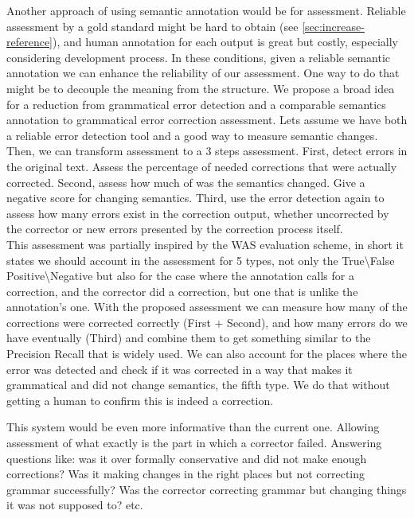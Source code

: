 \documentclass[english]{article}
\begin{document}
{Another approach of using semantic annotation would be for assessment.
Reliable assessment by a gold standard might be hard to obtain (see
\ref{sec:increase-reference}), and human annotation for each output is great\cite{madnani2011they}
but costly, especially considering development process. In these conditions,
given a reliable semantic annotation we can enhance the reliability
of our assessment. One way to do that might be to decouple the meaning
from the structure. We propose a broad idea for a reduction from grammatical
error detection and a comparable semantics annotation to grammatical
error correction assessment. Lets assume we have both a reliable error
detection tool and a good way to measure semantic changes. Then, we
can transform assessment to a 3 steps assessment. First, detect errors
in the original text. Assess the percentage of needed corrections
that were actually corrected. Second, assess how much of was the semantics
changed. Give a negative score for changing semantics. Third, use
the error detection again to assess how many errors exist in the correction
output, whether uncorrected by the corrector or new errors presented
by the correction process itself. \\

This assessment was partially inspired by the WAS evaluation scheme\cite{chodorow2012problems},
in short it states we should account in the assessment for 5 types,
not only the True\textbackslash{}False Positive\textbackslash{}Negative
but also for the case where the annotation calls for a correction,
and the corrector did a correction, but one that is unlike the annotation's
one. With the proposed assessment we can measure how many of the corrections
were corrected correctly (First + Second), and how many errors do
we have eventually (Third) and combine them to get something similar
to the Precision Recall that is widely used. We can also account for
the places where the error was detected and check if it was corrected
in a way that makes it grammatical and did not change semantics, the
fifth type. We do that without getting a human to confirm this is
indeed a correction.

This system would be even more informative than the current one. Allowing assessment of
what exactly is the part in which a corrector failed. Answering questions
like: was it over formally conservative and did not make enough corrections?
Was it making changes in the right places but not correcting grammar
successfully? Was the corrector correcting grammar but changing things
it was not supposed to? etc.

}
\end{document}
